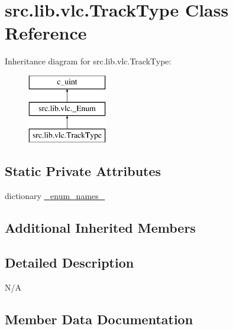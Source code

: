 \hypertarget{classsrc_1_1lib_1_1vlc_1_1TrackType}{}\section{src.\+lib.\+vlc.\+Track\+Type Class Reference}
\label{classsrc_1_1lib_1_1vlc_1_1TrackType}
Inheritance diagram for src.\+lib.\+vlc.\+Track\+Type\+:\begin{figure}[H]
\begin{center}
\leavevmode
\includegraphics[height=3.000000cm]{classsrc_1_1lib_1_1vlc_1_1TrackType}
\end{center}
\end{figure}
\subsection*{Static Private Attributes}
\begin{DoxyCompactItemize}
\item 
dictionary \hyperlink{classsrc_1_1lib_1_1vlc_1_1TrackType_aa3208a05816c8c0f30e111fae7974667}{\+\_\+enum\+\_\+names\+\_\+}
\end{DoxyCompactItemize}
\subsection*{Additional Inherited Members}


\subsection{Detailed Description}
\begin{DoxyVerb}N/A
\end{DoxyVerb}
 

\subsection{Member Data Documentation}
\hypertarget{classsrc_1_1lib_1_1vlc_1_1TrackType_aa3208a05816c8c0f30e111fae7974667}{}
